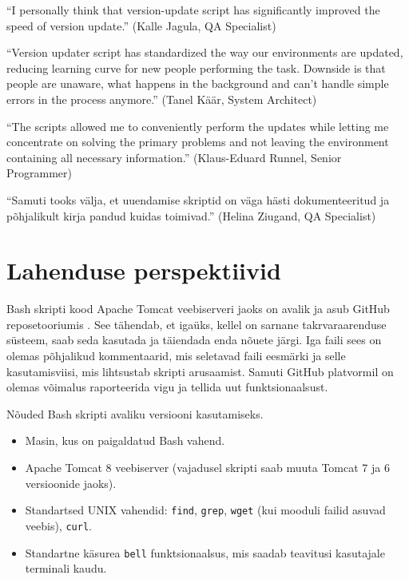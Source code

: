 \documentclass[12pt]{report}
\newcommand{\code}[1]{\texttt{#1}}
\begin{document}
   \begin{displayquote}
   ``I personally think that version-update script has significantly improved the speed of version update.'' (Kalle Jagula, QA Specialist)
   \end{displayquote}
   
   \begin{displayquote}
    ``Version updater script has standardized the way our environments are updated, reducing learning curve for new people performing the task. Downside is that people are unaware, what happens in the background and can't handle simple errors in the process anymore.'' (Tanel Käär, System Architect)
    \end{displayquote}
    
    \begin{displayquote}
    ``The scripts allowed me to conveniently perform the updates while letting me concentrate on solving the primary problems and not leaving the environment containing all necessary information.'' (Klaus-Eduard Runnel, Senior Programmer)
    \end{displayquote}
    
    \begin{displayquote}
    ``Samuti tooks välja, et uuendamise skriptid on väga hästi dokumenteeritud ja põhjalikult kirja pandud kuidas toimivad.'' (Helina Ziugand, QA Specialist)
    \end{displayquote}

  \newpage
  
  \section{Lahenduse perspektiivid}
  
  Bash skripti kood Apache Tomcat veebiserveri jaoks on avalik ja asub GitHub reposetooriumis \footnotemark. See tähendab, et igaüks, kellel on sarnane takrvaraarenduse süsteem, saab seda kasutada ja täiendada enda nõuete järgi. Iga faili sees on olemas põhjalikud kommentaarid, mis seletavad faili eesmärki ja selle kasutamisviisi, mis lihtsustab skripti arusaamist. Samuti GitHub platvormil on olemas võimalus raporteerida vigu ja tellida uut funktsionaalsust.\\
  
  
  Nõuded Bash skripti avaliku versiooni kasutamiseks.
  \begin{itemize}
    \item Masin, kus on paigaldatud Bash vahend.
    \item Apache Tomcat 8 veebiserver (vajadusel skripti saab muuta Tomcat 7 ja 6 versioonide jaoks).
    \item Standartsed UNIX vahendid: \code{find}, \code{grep}, \code{wget} (kui mooduli failid asuvad veebis), \code{curl}.
    \item Standartne käsurea \code{bell} funktsionaalsus, mis saadab teavitusi kasutajale terminali kaudu.
  \end{itemize}\\
  
\end{document}
